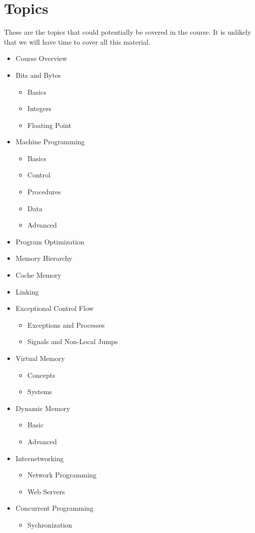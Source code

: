 \documentclass{article}
\begin{document}
\section{Topics}
\label{sec:orgheadline6}
These are the topics that could potentially be covered in the course.
It is unlikely that we will have time to cover all this material.
\begin{itemize}
\item Course Overview
\item Bits and Bytes
\begin{itemize}
\item Basics
\item Integers
\item Floating Point
\end{itemize}
\item Machine Programming
\begin{itemize}
\item Basics
\item Control
\item Procedures
\item Data
\item Advanced
\end{itemize}
\item Program Optimization
\item Memory Hierarchy
\item Cache Memory
\item Linking
\item Exceptional Control Flow
\begin{itemize}
\item Exceptions and Processes
\item Signals and Non-Local Jumps
\end{itemize}
\item Virtual Memory
\begin{itemize}
\item Concepts
\item Systems
\end{itemize}
\item Dynamic Memory
\begin{itemize}
\item Basic
\item Advanced
\end{itemize}
\item Internetworking
\begin{itemize}
\item Network Programming
\item Web Servers
\end{itemize}
\item Concurrent Programming
\begin{itemize}
\item Sychronization
\end{itemize}
\end{itemize}
\end{document}
